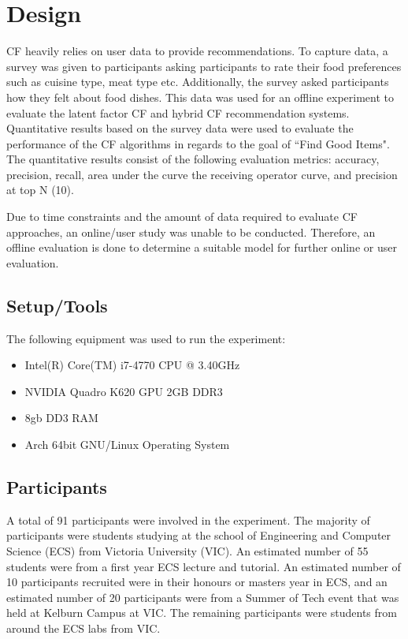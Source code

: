 \section{Design}

 CF heavily relies on user data to provide recommendations. To capture data, a survey was given to participants asking participants to rate their food preferences such as cuisine type, meat type etc. Additionally, the survey asked participants how they felt about food dishes. This data was used for an offline experiment to evaluate the latent factor CF and hybrid CF recommendation systems.  Quantitative results based on the survey data were used to evaluate the performance of the CF algorithms in regards to the goal of ``Find Good Items". The quantitative results consist of the following evaluation metrics: accuracy, precision, recall, area under the curve the receiving operator curve, and precision at top N (10). 


Due to time constraints and the amount of data required to evaluate CF approaches, an online/user study was unable to be conducted. Therefore, an offline evaluation is done to determine a suitable model for further online or user evaluation. 


\subsection{Setup/Tools}
The following equipment was used to run the experiment:
\begin{itemize}
	\item{Intel(R) Core(TM) i7-4770 CPU @ 3.40GHz}
	\item{NVIDIA Quadro K620 GPU 2GB DDR3}
	\item{8gb DD3 RAM}
	\item{Arch 64bit GNU/Linux Operating System}
\end{itemize}

\subsection{Participants}

A total of 91 participants were involved in the experiment. The majority of participants were students studying at the school of Engineering and Computer Science (ECS) from Victoria University (VIC). An estimated number of 55 students were from a first year ECS lecture and tutorial. An estimated number of 10 participants recruited were in their honours or masters year in ECS, and an estimated number of 20 participants were from a Summer of Tech event that was held at Kelburn Campus at VIC. The remaining participants were students from around the ECS labs from VIC.

